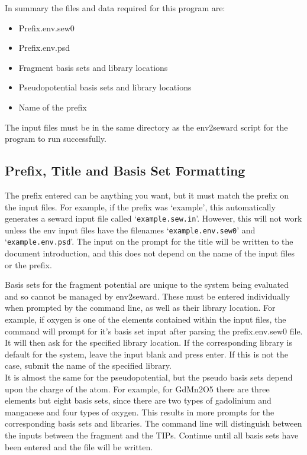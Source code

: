 \documentclass[10pt]{article}
\begin{document}
In summary the files and data required for this program are:
\begin{itemize}
	\item Prefix.env.sew0
	\item Prefix.env.psd
	\item Fragment basis sets and library locations
	\item Pseudopotential basis sets and library locations
	\item Name of the prefix
\end{itemize}
The input files must be in the same directory as the env2seward script for the program to run successfully.

\subsection{Prefix, Title and Basis Set Formatting}

The prefix entered can be anything you want, but it must match the prefix on the input files. For example, if the prefix was `example', this automatically generates a seward input file called `\texttt{example.sew.in}'. However, this will not work unless the env input files have the filenames `\texttt{example.env.sew0}' and `\texttt{example.env.psd}'. The input on the prompt for the title will be written to the document introduction, and this does not depend on the name of the input files or the prefix.

Basis sets for the fragment potential are unique to the system being evaluated and so cannot be managed by env2seward. These must be entered individually when prompted by the command line, as well as their library location. For example, if oxygen is one of the elements contained within the input files, the command will prompt for it's basis set input after parsing the prefix.env.sew0 file. It will then ask for the specified library location. If the corresponding library is default for the system, leave the input blank and press enter. If this is not the case, submit the name of the specified library.
\\
It is almost the same for the pseudopotential, but the pseudo basis sets depend upon the charge of the atom. For example, for GdMn2O5 there are three elements but eight basis sets, since there are two types of gadolinium and manganese and four types of oxygen. This results in more prompts for the corresponding basis sets and libraries. The command line will distinguish between the inputs between the fragment and the TIPs. Continue until all basis sets have been entered and the file will be written.
\end{document}
